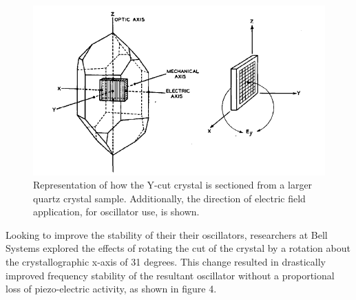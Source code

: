 \begin{figure}[hbtp]
	\centering
	\includegraphics[width=1.0\textwidth]{Chapter-2/fig3_Y_cut_crystal}
	\caption{Representation of how the Y-cut crystal is sectioned from a larger quartz crystal sample. Additionally, the direction of electric field application, for oscillator use, is shown.\cite{211}}
	\label{fig3:Y cut crystal}
\end{figure}





Looking to improve the stability of their their oscillators, researchers at Bell Systems explored the effects of rotating the cut of the crystal by a rotation about the crystallographic x-axis of 31 degrees. This change resulted in drastically improved frequency stability of the resultant oscillator without a proportional loss of piezo-electric activity, as shown in figure 4.


